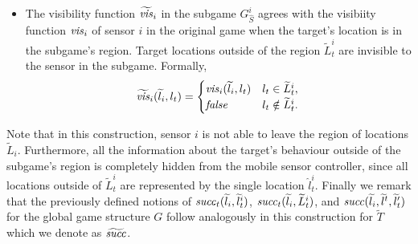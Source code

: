 \begin{itemize}
  \item The visibility function $\widetilde{\mathit{vis}}_i$ in the subgame $G^{i}_{\hat{S}}$ agrees with the visibiity function $\mathit{vis}_i$ of sensor $i$ in the original game when the target's location is in the subgame's region. Target locations outside of the region $\widetilde L_t^i$ are invisible to the sensor in the subgame. Formally, 
 \[\widetilde{\mathit{vis}}_i(\widetilde{l}_i,l_t) = \begin{cases}
\mathit{vis}_i(\widetilde{l}_i,l_t) & l_t \in \widetilde{L}_t^i, \\
\mathit{false} & l_t \notin \widetilde{L}_t^i.
\end{cases}
\]
\end{itemize}
Note that in this construction, sensor $i$ is not able to leave the region of locations $\widetilde{L}_i$. Furthermore, all the information about the target's behaviour outside of  the subgame's region is completely hidden from the mobile sensor controller, since all locations outside of  $\widetilde{L}_t^i$ are represented by the single location $\hat{l}_t^i$.
Finally we remark that the previously defined notions of $\mathit{succ}_t(\widetilde{l}_i,\widetilde{l}^i_{t})$, $\mathit{succ}_t(\widetilde{l}_i,\widetilde{L}^i_{t})$, and $\mathit{succ}(\widetilde{l}_i,\widetilde{l}^{t},\widetilde{l}_{t}')$ for the global game structure $G$ follow analogously in this construction for $\widetilde{T}$ which we denote as $\widetilde{\mathit{succ}}$.


